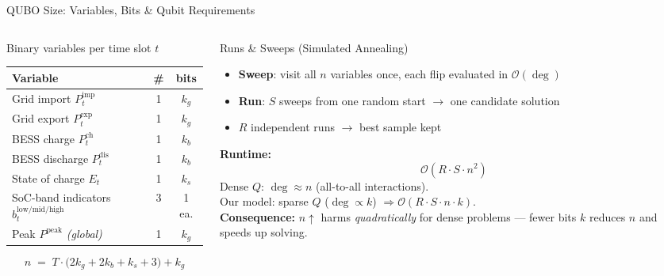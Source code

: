 \documentclass[aspectratio=169]{beamer}
\begin{document}
\begin{frame}{QUBO Size: Variables, Bits \& Qubit Requirements}
\begin{columns}[t]
\begin{column}{0.50\textwidth}
\begin{block}{Binary variables per time slot $t$}
\scriptsize
\begin{tabular}{lcc}
\toprule
Variable & \# & bits \\
\midrule
Grid import $P^{\text{imp}}_t$    & 1 & $k_g$ \\
Grid export $P^{\text{exp}}_t$    & 1 & $k_g$ \\
BESS charge $P^{\text{ch}}_t$     & 1 & $k_b$ \\
BESS discharge $P^{\text{dis}}_t$ & 1 & $k_b$ \\
State of charge $E_t$             & 1 & $k_s$ \\
SoC-band indicators $b^{\mathrm{low/mid/high}}_t$ & 3 & 1 ea. \\
\midrule
Peak $P^{\text{peak}}$ \emph{(global)} & 1 & $k_g$ \\
\bottomrule
\end{tabular}
\[
n \;=\; T\cdot\bigl(2k_g + 2k_b + k_s + 3\bigr) + k_g
\]
\end{block}
\end{column}
\begin{column}{0.46\textwidth}
\begin{block}{Runs \& Sweeps (Simulated Annealing)}
\footnotesize
\begin{itemize}
    \item \textbf{Sweep}: visit all $n$ variables once, each flip evaluated in $\mathcal{O}(\deg)$
    \item \textbf{Run}: $S$ sweeps from one random start $\rightarrow$ one candidate solution
    \item $R$ independent runs $\rightarrow$ best sample kept
\end{itemize}
\vspace{0.3em}
\textbf{Runtime:}
\[
\mathcal{O}(R\cdot S\cdot n^2)
\]
Dense $Q$: $\deg \approx n$ (all-to-all interactions). \\
Our model: sparse $Q$ ($\deg \propto k$) $\Rightarrow \mathcal{O}(R\cdot S\cdot n\cdot k)$.\\[0.4em]
\textbf{Consequence:} $n \uparrow$ harms \emph{quadratically} for dense problems — fewer bits $k$ reduces $n$ and speeds up solving.

\end{block}
\end{column}
\end{columns}
\end{frame}
\end{document}
